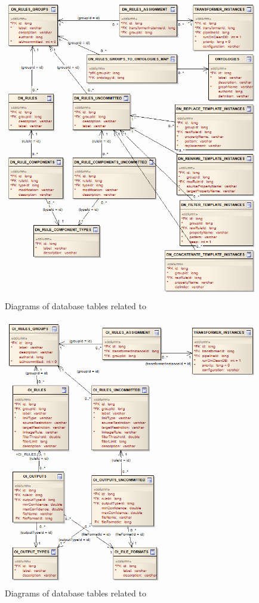 \begin{figure}[htbp]
    \centering
    \includegraphics[scale=0.6]{images/db-dn.png}
    \caption{Diagrams of database tables related to \DN}
	\label{fig:dbDN}
\end{figure}

\begin{figure}[htbp]
    \centering
    \includegraphics[scale=0.6]{images/db-oi.png}
    \caption{Diagrams of database tables related to \OI}
	\label{fig:dbOI}
\end{figure}

